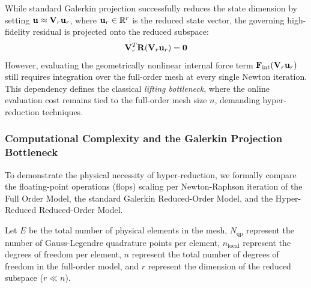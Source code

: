 While standard Galerkin projection successfully reduces the state dimension by setting $\mathbf{u} \approx \mathbf{V}_r \mathbf{u}_r$, where $\mathbf{u}_r \in \mathbb{R}^r$ is the reduced state vector, the governing high-fidelity residual is projected onto the reduced subspace:
\begin{equation}
        \mathbf{V}_r^T \mathbf{R}(\mathbf{V}_r \mathbf{u}_r) = \mathbf{0}
\end{equation}
However, evaluating the geometrically nonlinear internal force term $\mathbf{F}_{\text{int}}(\mathbf{V}_r \mathbf{u}_r)$ still requires integration over the full-order mesh at every single Newton iteration. This dependency defines the classical \textit{lifting bottleneck}, where the online evaluation cost remains tied to the full-order mesh size $n$, demanding hyper-reduction techniques.

\subsubsection{Computational Complexity and the Galerkin Projection Bottleneck}
To demonstrate the physical necessity of hyper-reduction, we formally compare the floating-point operations (\acrshort{flops}) scaling per Newton-Raphson iteration of the Full Order Model, the standard Galerkin Reduced-Order Model, and the Hyper-Reduced Reduced-Order Model.

Let $E$ be the total number of physical elements in the mesh, $N_{\text{qp}}$ represent the number of Gauss-Legendre quadrature points per element, $n_{\text{local}}$ represent the degrees of freedom per element, $n$ represent the total number of degrees of freedom in the full-order model, and $r$ represent the dimension of the reduced subspace ($r \ll n$).

